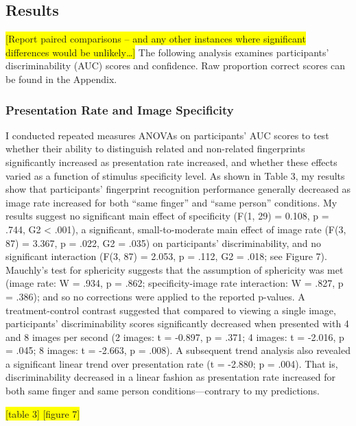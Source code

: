 \documentclass[
  english,
  man]{apa6}
\begin{document}
\hypertarget{results-1}{%
\subsection{Results}\label{results-1}}

\colorbox{yellow}{[Report paired comparisons – and any other instances where significant differences would be unlikely…]}
The following analysis examines participants' discriminability (AUC) scores and confidence. Raw proportion correct scores can be found in the Appendix.

\hypertarget{presentation-rate-and-image-specificity}{%
\subsubsection{Presentation Rate and Image Specificity}\label{presentation-rate-and-image-specificity}}

I conducted repeated measures ANOVAs on participants' AUC scores to test whether their ability to distinguish related and non-related fingerprints significantly increased as presentation rate increased, and whether these effects varied as a function of stimulus specificity level. As shown in Table 3, my results show that participants' fingerprint recognition performance generally decreased as image rate increased for both ``same finger'' and ``same person'' conditions. My results suggest no significant main effect of specificity (F(1, 29) = 0.108, p = .744, G2 \textless{} .001), a significant, small-to-moderate main effect of image rate (F(3, 87) = 3.367, p = .022, G2 = .035) on participants' discriminability, and no significant interaction (F(3, 87) = 2.053, p = .112, G2 = .018; see Figure 7). Mauchly's test for sphericity suggests that the assumption of sphericity was met (image rate: W = .934, p = .862; specificity-image rate interaction: W = .827, p = .386); and so no corrections were applied to the reported p-values. A treatment-control contrast suggested that compared to viewing a single image, participants' discriminability scores significantly decreased when presented with 4 and 8 images per second (2 images: t = -0.897, p = .371; 4 images: t = -2.016, p = .045; 8 images: t = -2.663, p = .008). A subsequent trend analysis also revealed a significant linear trend over presentation rate (t = -2.880; p = .004). That is, discriminability decreased in a linear fashion as presentation rate increased for both same finger and same person conditions---contrary to my predictions.

\colorbox{yellow}{[table 3]
[figure 7]}
\end{document}
